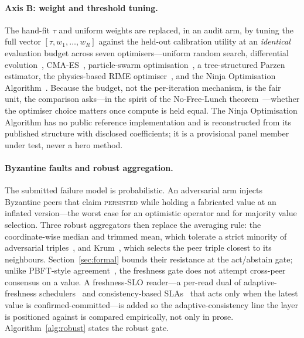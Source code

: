 \documentclass[11pt]{article}
\begin{document}
\paragraph{Axis B: weight and threshold tuning.} The hand-fit $\tau$ and uniform weights are replaced,
in an audit arm, by tuning the full vector $[\tau, w_1,\dots,w_R]$ against the held-out calibration
utility at an \emph{identical} evaluation budget across seven optimisers---uniform random search,
differential evolution~\cite{storn1997de}, CMA-ES~\cite{hansen2001cmaes}, particle-swarm
optimisation~\cite{kennedy1995pso}, a tree-structured Parzen estimator, the physics-based RIME
optimiser~\cite{su2023rime}, and the Ninja Optimisation Algorithm~\cite{elkenawy2024nioa}. Because the
budget, not the per-iteration mechanism, is the fair unit, the comparison asks---in the spirit of the
No-Free-Lunch theorem~\cite{wolpert1997nfl}---whether the optimiser choice matters once compute is
held equal. The Ninja Optimisation Algorithm has no public reference implementation and is
reconstructed from its published structure with disclosed coefficients; it is a provisional panel
member under test, never a hero method.

\paragraph{Byzantine faults and robust aggregation.} The submitted failure model is probabilistic. An
adversarial arm injects Byzantine peers that claim \textsc{persisted} while holding a fabricated value
at an inflated version---the worst case for an optimistic operator and for majority value selection.
Three robust aggregators then replace the averaging rule: the coordinate-wise median and trimmed mean,
which tolerate a strict minority of adversarial triples~\cite{yin2018byzantine}, and
Krum~\cite{blanchard2017krum}, which selects the peer triple closest to its neighbours.
Section~\ref{sec:formal} bounds their resistance at the act/abstain gate; unlike PBFT-style
agreement~\cite{castro2002pbft}, the freshness gate does not attempt cross-peer consensus on a value.
A freshness-SLO reader---a per-read dual of adaptive-freshness schedulers~\cite{wooders2024ralf} and
consistency-based SLAs~\cite{terry2013pileus,bailis2012pbs} that acts only when the latest value is
confirmed-committed---is added so the adaptive-consistency line the layer is positioned against is
compared empirically, not only in prose. Algorithm~\ref{alg:robust} states the robust gate.
\end{document}
